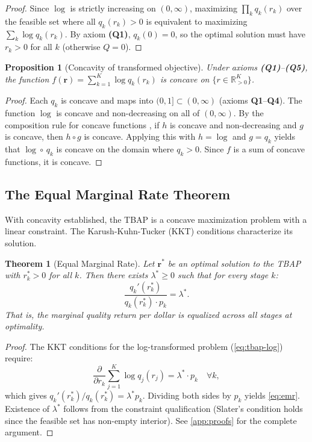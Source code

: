 \documentclass[11pt, a4paper, copyright]{googledeepmind}
\newtheorem{theorem}{Theorem}[section]
\newtheorem{proposition}{Proposition}[section]
\begin{document}
\begin{proof}
Since $\log$ is strictly increasing on $(0, \infty)$, maximizing $\prod_k q_k(r_k)$ over the feasible set where all $q_k(r_k) > 0$ is equivalent to maximizing $\sum_k \log q_k(r_k)$. By axiom \textbf{(Q1)}, $q_k(0) = 0$, so the optimal solution must have $r_k > 0$ for all $k$ (otherwise $Q = 0$).
\end{proof}

\begin{proposition}[Concavity of transformed objective]\label{prop:concavity}
Under axioms \textbf{(Q1)}--\textbf{(Q5)}, the function $f(\mathbf{r}) = \sum_{k=1}^K \log q_k(r_k)$ is concave on $\{r \in \mathbb{R}_{>0}^K\}$.
\end{proposition}

\begin{proof}
Each $q_k$ is concave and maps into $(0,1] \subset (0, \infty)$ (axioms \textbf{Q1}--\textbf{Q4}). The function $\log$ is concave and non-decreasing on all of $(0, \infty)$. By the composition rule for concave functions \citep[Section 3.2.4]{boyd2004}, if $h$ is concave and non-decreasing and $g$ is concave, then $h \circ g$ is concave. Applying this with $h = \log$ and $g = q_k$ yields that $\log \circ\, q_k$ is concave on the domain where $q_k > 0$. Since $f$ is a sum of concave functions, it is concave.
\end{proof}

\subsection{The Equal Marginal Rate Theorem}

With concavity established, the TBAP is a concave maximization problem with a linear constraint. The Karush-Kuhn-Tucker (KKT) conditions characterize its solution.

\begin{theorem}[Equal Marginal Rate]\label{thm:emr}
Let $\mathbf{r}^*$ be an optimal solution to the TBAP with $r_k^* > 0$ for all $k$. Then there exists $\lambda^* \geq 0$ such that for every stage $k$:
\begin{equation}\label{eq:emr}
    \frac{q_k'(r_k^*)}{q_k(r_k^*) \cdot p_k} = \lambda^*.
\end{equation}
That is, the \emph{marginal quality return per dollar} is equalized across all stages at optimality.
\end{theorem}

\begin{proof}
The KKT conditions for the log-transformed problem (\cref{eq:tbap-log}) require:
\[
    \frac{\partial}{\partial r_k} \sum_{j=1}^K \log q_j(r_j) = \lambda^* \cdot p_k \quad \forall k,
\]
which gives $q_k'(r_k^*) / q_k(r_k^*) = \lambda^* p_k$. Dividing both sides by $p_k$ yields \cref{eq:emr}. Existence of $\lambda^*$ follows from the constraint qualification (Slater's condition holds since the feasible set has non-empty interior). See \cref{app:proofs} for the complete argument.
\end{proof}
\end{document}
